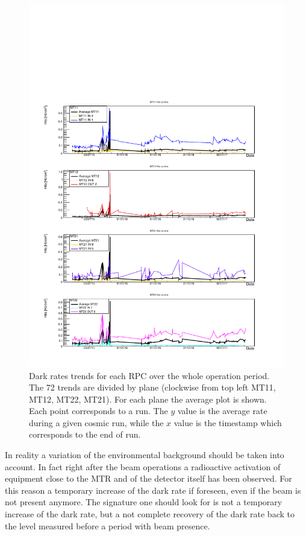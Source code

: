\begin{figure}[!t]
\begin{center}
\includegraphics[width=0.95\linewidth]{Chapters/Performance/Figs/DarkRate.pdf}
\caption{Dark rates trends for each RPC over the whole operation period. The 72 trends are divided by plane (clockwise from top left MT11, MT12, MT22, MT21). For each plane the average plot is shown. Each point corresponds to a run. The $y$ value is the average rate during a given cosmic run, while the $x$ value is the timestamp which corresponds to the end of run.}
\label{fig:DarkRate4Planes}
\end{center}
\end{figure}

In reality a variation of the environmental background should be taken into account.
In fact right after the beam operations a radioactive activation of equipment close to the MTR and of the detector itself has been observed.
For this reason a temporary increase of the dark rate if foreseen, even if the beam is not present anymore.
The signature one should look for is not a temporary increase of the dark rate, but a not complete recovery of the dark rate back to the level measured before a period with beam presence.

